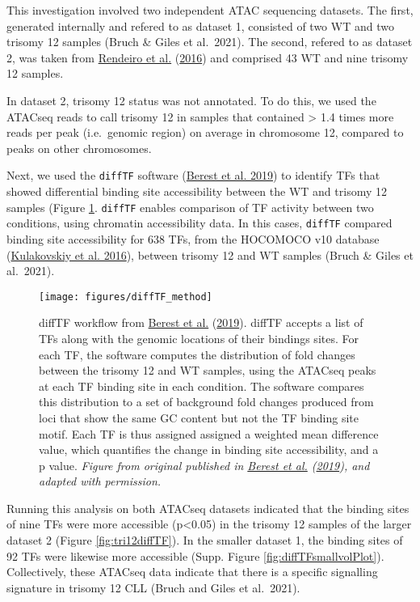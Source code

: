 \documentclass[11pt, a4paper, twosided]{book}
\begin{document}
This investigation involved two independent ATAC sequencing datasets. The first, generated internally and refered to as dataset 1, consisted of two WT and two trisomy 12 samples (Bruch \& Giles et al.~2021). The second, refered to as dataset 2, was taken from \protect\hyperlink{ref-Rendeiro2016}{Rendeiro et al.} (\protect\hyperlink{ref-Rendeiro2016}{2016}) and comprised 43 WT and nine trisomy 12 samples.

In dataset 2, trisomy 12 status was not annotated. To do this, we used the ATACseq reads to call trisomy 12 in samples that contained \textgreater{} 1.4 times more reads per peak (i.e.~genomic region) on average in chromosome 12, compared to peaks on other chromosomes.

Next, we used the \texttt{diffTF} software (\protect\hyperlink{ref-Berest2019}{Berest et al. 2019}) to identify TFs that showed differential binding site accessibility between the WT and trisomy 12 samples (Figure \ref{fig:diffTFexplainer}. \texttt{diffTF} enables comparison of TF activity between two conditions, using chromatin accessibility data. In this cases, \texttt{diffTF} compared binding site accessibility for 638 TFs, from the HOCOMOCO v10 database (\protect\hyperlink{ref-HOCOMOCO}{Kulakovskiy et al. 2016}), between trisomy 12 and WT samples (Bruch \& Giles et al.~2021).


\begin{figure}

{\centering \texttt{[image: figures/diffTF\_method]} 

}

\caption{diffTF workflow from \protect\hyperlink{ref-Berest2019}{Berest et al.} (\protect\hyperlink{ref-Berest2019}{2019}). diffTF accepts a list of TFs along with the genomic locations of their bindings sites. For each TF, the software computes the distribution of fold changes between the trisomy 12 and WT samples, using the ATACseq peaks at each TF binding site in each condition. The software compares this distribution to a set of background fold changes produced from loci that show the same GC content but not the TF binding site motif. Each TF is thus assigned assigned a weighted mean difference value, which quantifies the change in binding site accessibility, and a p value. \emph{Figure from original published in \protect\hyperlink{ref-Berest2019}{Berest et al.} (\protect\hyperlink{ref-Berest2019}{2019}), and adapted with permission.}}\label{fig:diffTFexplainer}
\end{figure}
Running this analysis on both ATACseq datasets indicated that the binding sites of nine TFs were more accessible (p\textless0.05) in the trisomy 12 samples of the larger dataset 2 (Figure \ref{fig:tri12diffTF}). In the smaller dataset 1, the binding sites of 92 TFs were likewise more accessible (Supp. Figure \ref{fig:diffTFsmallvolPlot}). Collectively, these ATACseq data indicate that there is a specific signalling signature in trisomy 12 CLL (Bruch and Giles et al.~2021).
\end{document}
